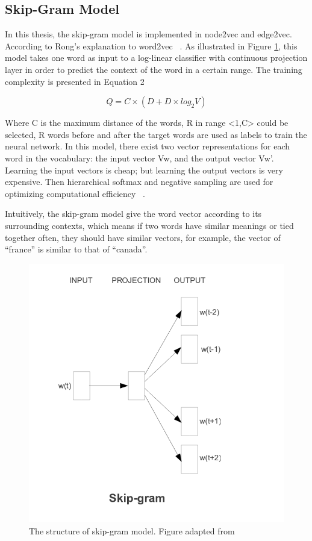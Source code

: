 \subsection{Skip-Gram Model}

In this thesis, the skip-gram model is implemented in node2vec and edge2vec. According to Rong’s explanation to word2vec ~\cite{rong_word2vec_2014}. As illustrated in Figure \ref{fig:skip-gram}, this model takes one word as input to a log-linear classifier with continuous projection layer in order to predict the context of the word in a certain range. The training complexity is presented in Equation 2

\begin{equation}
Q=C\times(D+D\times log_{2}V)
\end{equation}

Where C is the maximum distance of the words, R in range <1,C> could be selected, R words before and after the target words are used as labels to train the neural network. In this model, there exist two vector representations for each word in the vocabulary: the input vector Vw, and the output vector Vw’. Learning the input vectors is cheap; but learning the output vectors is very expensive. Then hierarchical softmax and negative sampling are used for optimizing computational efficiency ~\cite{rong_word2vec_2014}.

Intuitively, the skip-gram model give the word vector according to its surrounding contexts, which means if two words have similar meanings or tied together often, they should have similar vectors, for example, the vector of “france” is similar to that of “canada”.

\begin{figure}[!h]
    \centering
    \includegraphics[scale=0.35]
    {figures/skip-gram.png}
    \captionsetup{justification=centering}
    \caption[The structure of skip-gram model]{\label{fig:skip-gram} The structure of skip-gram model. Figure adapted from ~\cite{mikolov_efficient_2013}}
\end{figure}

